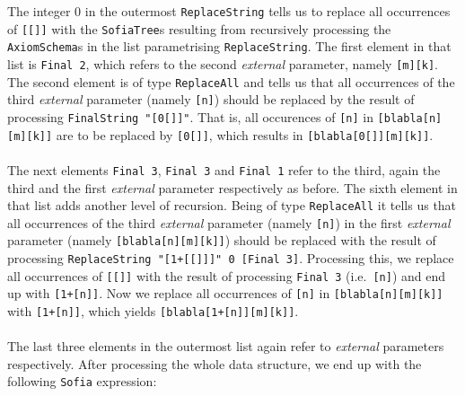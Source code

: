 \documentclass[notitlepage]{report}
\newcommand\m[1]{\texttt{#1}}
\begin{document}
The integer 0 in the outermost \m{ReplaceString} tells us to replace all
occurrences of \texttt{[[]]} with the \m{SofiaTree}s resulting from recursively
processing the \m{AxiomSchema}s in the list parametrising \m{ReplaceString}. The
first element in that list is \m{Final 2}, which refers to the second
\emph{external} parameter, namely \texttt{[m][k]}. The second element is of type
\m{ReplaceAll} and tells us that all occurrences of the third \emph{external}
parameter (namely \texttt{[n]}) should be replaced by the result of processing
\m{FinalString "[0[]]"}. That is, all occurences of \texttt{[n]} in
\texttt{[blabla[n][m][k]]} are to be replaced by \texttt{[0[]]}, which results
in \texttt{[blabla[0[]][m][k]]}.
\\\\
The next elements \m{Final 3}, \m{Final 3} and \m{Final 1} refer to the
third, again the third and the first \emph{external} parameter respectively as
before. The sixth element in that list adds another level of recursion. Being of
type \m{ReplaceAll} it tells us that all occurrences of the third
\emph{external} parameter (namely \texttt{[n]}) in the first \emph{external}
parameter (namely \texttt{[blabla[n][m][k]]}) should be replaced with the result
of processing \m{ReplaceString "[1+[[]]]" 0 [Final 3]}. Processing this, we
replace all occurrences of \texttt{[[]]} with the result of processing
\m{Final 3} (i.e.\ \texttt{[n]}) and end up with \texttt{[1+[n]]}. Now we
replace all occurrences of \texttt{[n]} in \texttt{[blabla[n][m][k]]} with
\texttt{[1+[n]]}, which yields \texttt{[blabla[1+[n]][m][k]]}.
\\\\
The last three elements in the outermost list again refer to \emph{external}
parameters respectively. After processing the whole data structure, we end up
with the following \m{Sofia} expression:
\begin{quote}\vbox%
{\haddockverb\begin{verbatim}
[[m][k][blabla[n][m][k]][[n][[n]nat][blabla[n][m][k]]:[blabla[n][m][k]]]:
 [[n][[n]nat]:[blabla[n][m][k]]]] 
\end{verbatim}}
\end{quote}



\pagebreak
\begingroup
{}
\setlength\bibitemsep{10pt}
\printbibliography\
\endgroup
\end{document}
